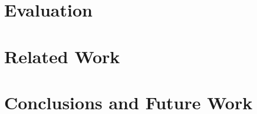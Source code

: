 \documentclass[sigplan,screen,10pt]{acmart}\settopmatter{}
\begin{document}
\section{Evaluation} \label{Sec:evaluation}


\section{Related Work} \label{Sec:relatedwork}


\vspace{-5mm}
\section{Conclusions and Future Work} \label{Sec:conclusion}





\balance
%


\end{document}
